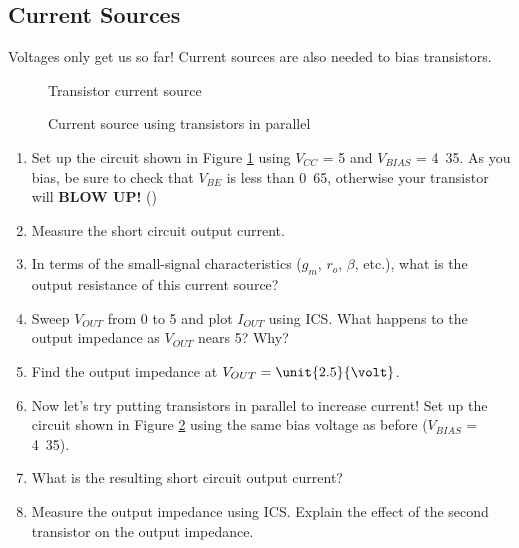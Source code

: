 \documentclass{article}
\begin{document}
\subsection{Current Sources}
Voltages only get us so far! Current sources are also needed to bias transistors.
	\begin{figure}[!htb]
		
		\centerline{\box\graph}
		\caption{Transistor current source}
		\label{lab6_csource1}
	\end{figure}

	\begin{figure}[!htb]
		
		\centerline{\box\graph}
		\caption{Current source using transistors in parallel}
		\label{lab6_csource2}
	\end{figure}

\begin{enumerate}
	\item Set up the circuit shown in Figure \ref{lab6_csource1} using $V_{CC}$ = \unit{5}{\volt} and $V_{BIAS}$ = \unit{4.35}{\volt}. As you bias, be sure to check that $V_{BE}$ is less than \unit{0.65}{\volt}, otherwise your transistor will \textbf{BLOW UP!} ()
	\item Measure the short circuit output current.
	\item In terms of the small-signal characteristics ($g_m$, $r_o$, $\beta$, etc.), what is the output resistance of this current source?
	\item Sweep $V_{OUT}$ from \unit{0}{\volt} to \unit{5}{\volt} and plot $I_{OUT}$ using ICS. What happens to the output impedance as $V_{OUT}$ nears \unit{5}{\volt}? Why?
	\item Find the output impedance at $V_{OUT} = \unit{2.5}{\volt}$.
	\item Now let's try putting transistors in parallel to increase current! Set up the circuit shown in Figure \ref{lab6_csource2} using the same bias voltage as before ($V_{BIAS}$ = \unit{4.35}{\volt}).
	\item What is the resulting short circuit output current?
	\item Measure the output impedance using ICS. Explain the effect of the second transistor on the output impedance.
\end{enumerate}
\end{document}
